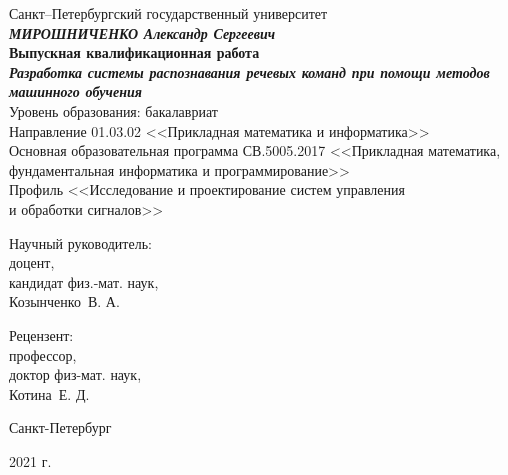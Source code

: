 \begin{titlepage}
\begin{center}
Санкт--Петербургский государственный университет
\vspace{30mm} \\
\textbf{\textit{\large МИРОШНИЧЕНКО Александр Сергеевич}} \\[5mm]
\textbf{\large Выпускная квалификационная работа} \\[5mm]
\textbf{\textit{\large Разработка системы распознавания речевых команд при помощи методов машинного обучения}} \\[10mm]
Уровень образования: бакалавриат\\
Направление 01.03.02 <<Прикладная математика и информатика>>\\
Основная образовательная программа СВ.5005.2017
<<Прикладная математика, фундаментальная информатика и программирование>>\\
Профиль <<Исследование и проектирование систем управления\\ и обработки сигналов>>\\[5mm]

\begin{flushright}
	\begin{minipage}[t]{0.4\textwidth}
	Научный руководитель:\\
	доцент,\\
	кандидат физ.-мат. наук,\\
	Козынченко~В. А.\\
	\end{minipage}

	\begin{minipage}[t]{0.4\textwidth}
	Рецензент:\\
	профессор,\\
	доктор физ-мат. наук, \\
	Котина~Е. Д.
	\end{minipage}
\end{flushright}
\vfill 
{Санкт-Петербург}
\par{2021 г.}
\end{center}
\end{titlepage}
\addtocounter{page}{1}